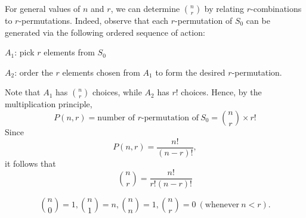 For general values of \(n\) and \(r\), we can determine \(\binom{n}{r}\) by relating \(r\)-combinations to \(r\)-permutations. Indeed, observe that each \(r\)-permutation of \(S_0\) can be generated via the following ordered sequence of action:

\(A_1\): pick \(r\) elements from \(S_0\)

\(A_2\): order the \(r\) elements chosen from \(A_1\) to form the desired \(r\)-permutation.

Note that \(A_1\) has \(\binom{n}{r}\) choices, while \(A_2\) has \(r!\) choices. Hence, by the multiplication principle,
\[
    P(n, r) = \text{number of }r\text{-permutation of}\ S_0 = \binom{n}{r} \times r!
\]
Since
\[
    P(n, r) = \dfrac{n!}{(n - r)!},
\]
it follows that 
\[
    \binom{n}{r} = \dfrac{n!}{r!(n - r)!}
\]

\begin{corollary}
    \[
        \binom{n}{0} = 1, \binom{n}{1} = n, \binom{n}{n} = 1, \binom{n}{r} = 0\ (\text{whenever}\ n < r).
    \]
\end{corollary}

